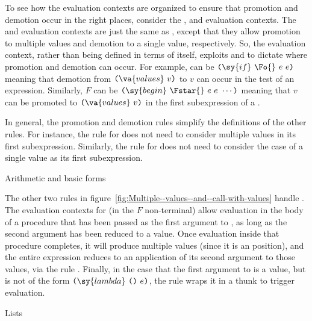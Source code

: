 To see how the evaluation contexts are organized to ensure that
promotion and demotion occur in the right places, consider the ,
\Fstar{} and \Fo{} evaluation contexts. The \Fstar{} and \Fo{}
evaluation contexts are just the same as , except that they allow
promotion to multiple values and demotion to a single value,
respectively. So, the  evaluation context, rather than being
defined in terms of itself, exploits \Fstar{} and \Fo{} to dictate
where promotion and demotion can occur. For example,  can be
$\texttt{(}\sy{if}~\Fo{}~e~e\texttt{)}$ meaning that demotion from
$\texttt{(}\va{values}~v\texttt{)}$ to
$v$ can occur in the test of an  expression.
Similarly, $F$ can be $\texttt{(}\sy{begin}~\Fstar{}~e~e~\cdots\texttt{)}$ meaning that
$v$ can be promoted to $\texttt{(}\va{values}~v\texttt{)}$ in the first subexpression of a .

In general, the promotion and demotion rules simplify the definitions
of the other rules. For instance, the rule for  does not
need to consider multiple values in its first subexpression.
Similarly, the rule for  does not need to consider the
case of a single value as its first subexpression.

\beginfig
\begin{center}


\end{center}
\caption{Arithmetic and basic forms}\label{fig:Arithmetic}
\endfig

The other two rules in
figure~\ref{fig:Multiple--values--and--call-with-values} handle
. The evaluation contexts for
 (in the $F$ non-terminal) allow
evaluation in the body of a procedure that has been passed as the first
argument to , as long as the second argument
has been reduced to a value. Once evaluation inside that procedure
completes, it will produce multiple values (since it is an \Fstar{}
position), and the entire  expression reduces
to an application of its second argument to those values, via the rule
. Finally, in the
case that the first argument to  is a value,
but is not of the form $\texttt{(}\sy{lambda}~\texttt{()}~e\texttt{)}$, the rule
 wraps it in a thunk to trigger evaluation.

\beginfig
\begin{center}

\end{center}
\caption{Lists}\label{fig:Cons}
\endfig

